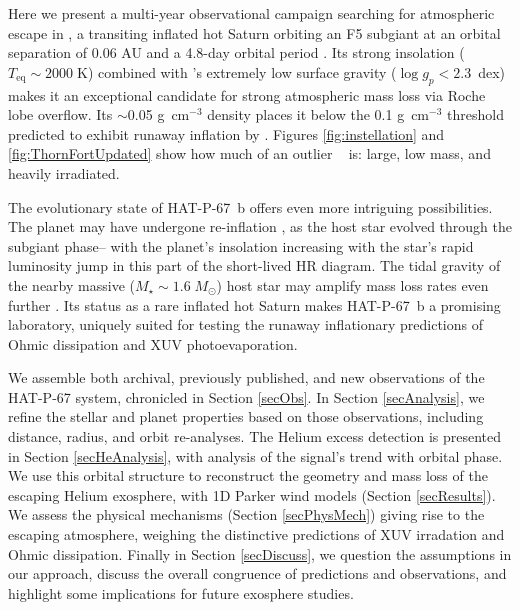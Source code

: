 \documentclass[twocolumn]{aastex631}
\newcommand{\hatpb}{\object{HAT-P-67 b}}
\begin{document}
Here we present a multi-year observational campaign searching for atmospheric escape in , a transiting inflated hot Saturn orbiting an F5 subgiant at an orbital separation of 0.06 AU and a 4.8-day orbital period \citep{2017AJ....153..211Z}.  Its strong insolation ($T_\mathrm{eq}\sim2000\;$K) combined with 's extremely low surface gravity ($\log{g_p}<2.3$~dex) makes it an exceptional candidate for strong atmospheric mass loss via Roche lobe overflow.  Its $\sim$0.05 g~cm$^{-3}$ density places it below the 0.1 g~cm$^{-3}$ threshold predicted to exhibit runaway inflation by \citet{2023ApJ...945L..36T}.  Figures \ref{fig:instellation} and \ref{fig:ThornFortUpdated} show how much of an outlier \hatpb~ is: large, low mass, and heavily irradiated.    

The evolutionary state of HAT-P-67~b offers even more intriguing possibilities.  The planet may have undergone re-inflation \citep{2022AJ....163...53S, 2022AJ....163..120G, 2023arXiv230306728G}, as the host star evolved through the subgiant phase-- with the planet's insolation increasing with the star's rapid luminosity jump in this part of the short-lived HR diagram.  The tidal gravity of the nearby massive ($M_\star \sim1.6\;M_\odot$) host star may amplify mass loss rates even further \citep{2007A&A...472..329E, 2023ApJ...945L..36T}. Its status as a rare inflated hot Saturn makes HAT-P-67~b a promising laboratory, uniquely suited for testing the runaway inflationary predictions of Ohmic dissipation and XUV photoevaporation.

We assemble both archival, previously published, and new observations of the HAT-P-67 system, chronicled in Section \ref{secObs}.  In Section \ref{secAnalysis}, we refine the stellar and planet properties based on those observations, including distance, radius, and orbit re-analyses.  The Helium excess detection is presented in Section \ref{secHeAnalysis}, with analysis of the signal's trend with orbital phase.  We use this orbital structure to reconstruct the geometry and mass loss of the escaping Helium exosphere, with 1D Parker wind models (Section \ref{secResults}).  We assess the physical mechanisms (Section \ref{secPhysMech}) giving rise to the escaping atmosphere, weighing the distinctive predictions of XUV irradation and Ohmic dissipation.  Finally in Section \ref{secDiscuss}, we question the assumptions in our approach, discuss the overall congruence of predictions and observations, and highlight some implications for future exosphere studies.
\end{document}
